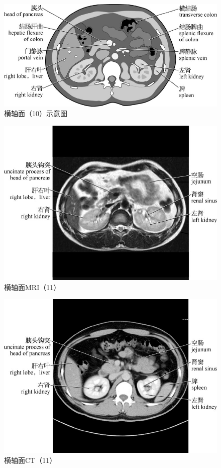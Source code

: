 \begin{figure}[!htbp]
 \centering
 \includegraphics{./images/Image00031.jpg}
 \captionsetup{justification=centering}
 \caption{横轴面（10）示意图}
  \end{figure} 
 \FloatBarrier

\begin{figure}[!htbp]
 \centering
 \includegraphics{./images/Image00032.jpg}
 \captionsetup{justification=centering}
 \caption{横轴面MRI（11）}
  \end{figure} 
 \FloatBarrier

\begin{figure}[!htbp]
 \centering
 \includegraphics{./images/Image00033.jpg}
 \captionsetup{justification=centering}
 \caption{横轴面CT（11）}
  \end{figure} 
 \FloatBarrier


